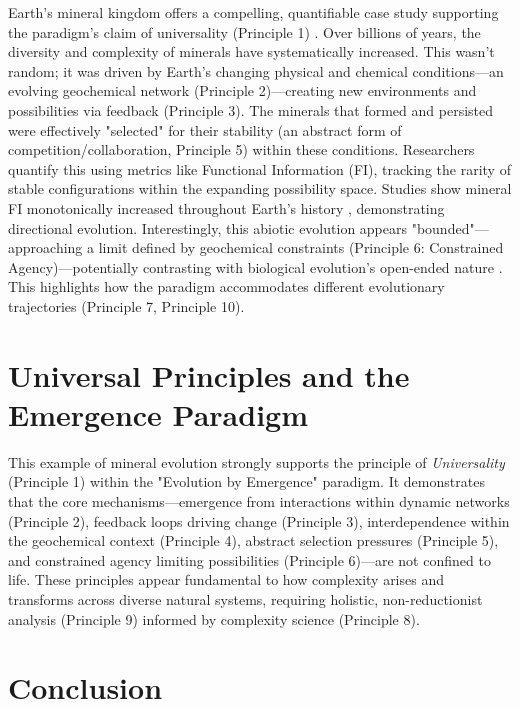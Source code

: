 \documentclass[12pt,openany]{book}
\begin{document}
Earth's mineral kingdom offers a compelling, quantifiable case study supporting the paradigm's claim of universality (Principle 1) \cite{HazenWong2024}. Over billions of years, the diversity and complexity of minerals have systematically increased. This wasn't random; it was driven by Earth's changing physical and chemical conditions—an evolving geochemical network (Principle 2)—creating new environments and possibilities via feedback (Principle 3). The minerals that formed and persisted were effectively "selected" for their stability (an abstract form of competition/collaboration, Principle 5) within these conditions. Researchers quantify this using metrics like Functional Information (FI), tracking the rarity of stable configurations within the expanding possibility space. Studies show mineral FI monotonically increased throughout Earth's history \cite{HazenWong2024}, demonstrating directional evolution. Interestingly, this abiotic evolution appears "bounded"—approaching a limit defined by geochemical constraints (Principle 6: Constrained Agency)—potentially contrasting with biological evolution's open-ended nature \cite{HazenWong2024, WongEtAl2023}. This highlights how the paradigm accommodates different evolutionary trajectories (Principle 7, Principle 10). %

\section*{Universal Principles and the Emergence Paradigm}

This example of mineral evolution strongly supports the principle of \emph{Universality} (Principle 1) within the "Evolution by Emergence" paradigm. It demonstrates that the core mechanisms—emergence from interactions within dynamic networks (Principle 2), feedback loops driving change (Principle 3), interdependence within the geochemical context (Principle 4), abstract selection pressures (Principle 5), and constrained agency limiting possibilities (Principle 6)—are not confined to life. These principles appear fundamental to how complexity arises and transforms across diverse natural systems, requiring holistic, non-reductionist analysis (Principle 9) informed by complexity science (Principle 8). %

\section*{Conclusion}
\end{document}
